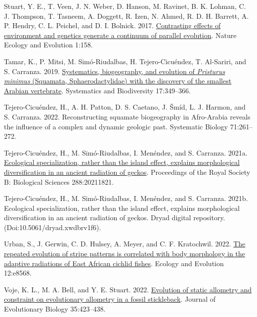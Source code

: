 \documentclass[
  11pt,
]{article}
\newlength{\cslhangindent}
\newlength{\cslentryspacingunit} %
\newenvironment{CSLReferences}[2] %
 {%
  \setlength{\parindent}{0pt}
  \ifodd #1
  \let\oldpar\par
  \def\par{\hangindent=\cslhangindent\oldpar}
  \fi
  \setlength{\parskip}{#2\cslentryspacingunit}
 }%
 {}
\begin{document}
\begin{CSLReferences}{1}{0}
\leavevmode{}%
Stuart, Y. E., T. Veen, J. N. Weber, D. Hanson, M. Ravinet, B. K.
Lohman, C. J. Thompson, T. Tasneem, A. Doggett, R. Izen, N. Ahmed, R. D.
H. Barrett, A. P. Hendry, C. L. Peichel, and D. I. Bolnick. 2017.
\href{https://doi.org/10.1038/s41559-017-0158}{Contrasting effects of
environment and genetics generate a continuum of parallel evolution}.
Nature Ecology and Evolution 1:158.

\leavevmode{}%
Tamar, K., P. Mitsi, M. Simó-Riudalbas, H. Tejero-Cicuéndez, T.
Al-Sariri, and S. Carranza. 2019.
\href{https://doi.org/10.1080/14772000.2019.1614694}{Systematics,
biogeography, and evolution of \emph{{P}risturus minimus} ({S}quamata,
{S}phaerodactylidae) with the discovery of the smallest {A}rabian
vertebrate}. Systematics and Biodiversity 17:349--366.

\leavevmode{}%
Tejero-Cicuéndez, H., A. H. Patton, D. S. Caetano, J. Šmíd, L. J.
Harmon, and S. Carranza. 2022. Reconstructing squamate biogeography in
{A}fro-{A}rabia reveals the influence of a complex and dynamic geologic
past. Systematic Biology 71:261--272.

\leavevmode{}%
Tejero-Cicuéndez, H., M. Simó-Riudalbas, I. Menéndez, and S. Carranza.
2021a. \href{https://doi.org/10.1098/rspb.2021.1821}{Ecological
specialization, rather than the island effect, explains morphological
diversification in an ancient radiation of geckos}. Proceedings of the
Royal Society B: Biological Sciences 288:20211821.

\leavevmode{}%
Tejero-Cicuéndez, H., M. Simó-Riudalbas, I. Menéndez, and S. Carranza.
2021b. Ecological specialization, rather than the island effect,
explains morphological diversification in an ancient radiation of
geckos. Dryad digital repository. (Doi:10.5061/dryad.xwdbrv1f6).

\leavevmode{}%
Urban, S., J. Gerwin, C. D. Hulsey, A. Meyer, and C. F. Kratochwil.
2022. \href{https://doi.org/10.1002/ece3.8568}{The repeated evolution of
stripe patterns is correlated with body morphology in the adaptive
radiations of {E}ast {A}frican cichlid fishes}. Ecology and Evolution
12:e8568.

\leavevmode{}%
Voje, K. L., M. A. Bell, and Y. E. Stuart. 2022.
\href{https://doi.org/10.1111/jeb.13984}{Evolution of static allometry
and constraint on evolutionary allometry in a fossil stickleback}.
Journal of Evolutionary Biology 35:423--438.


\end{CSLReferences}
\end{document}
